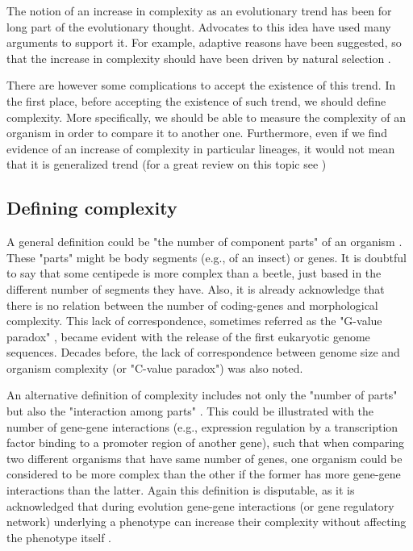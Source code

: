 The notion of an increase in complexity as an evolutionary trend has been for long part of the evolutionary thought. Advocates to this idea have used many arguments to support it. For example, adaptive reasons have been suggested, so that the increase in complexity should have been driven by natural selection \citep{bonner1988evolution,Carroll2001}.

There are however some complications to accept the existence of this trend. In the first place, before accepting the existence of such trend, we should define complexity.
More specifically, we should be able to measure the complexity of an organism in order to compare it to another one.
Furthermore, even if we find evidence of an increase of complexity in particular lineages, it would not mean that it is generalized trend (for a great review on this topic see \citep{McShea1996})


\subsection{Defining complexity}
A general definition could be "the number of component parts" of an organism \citep{McShea1996,Arthur2010}.
These "parts" might be body segments (e.g., of an insect) or genes.
It is doubtful to say that some centipede is more complex than a beetle, just based in the different number of segments they have.
Also, it is already acknowledge that there is no relation between the number of coding-genes and morphological complexity.
This lack of correspondence, sometimes referred as the "G-value paradox"
	\citep{Hahn2002},
became evident with the release of the first eukaryotic genome sequences.
Decades before, the lack of correspondence between genome size and organism complexity (or "C-value paradox") was also noted.

An alternative definition of complexity includes not only the "number of parts" but also the "interaction among parts" 
	\citep{McShea1996,Arthur2010}.
This could be illustrated with the number of gene-gene interactions (e.g., expression regulation by a transcription factor binding to a promoter region of another gene),
such that when comparing two different organisms that have same number of genes, 
one organism could be considered to be more complex than the other if the former has more gene-gene interactions than the latter.
Again this definition is disputable, as it is acknowledged that during evolution gene-gene interactions (or gene regulatory network) underlying a phenotype
can increase their complexity without affecting the phenotype itself
	\citep{Muller1999,True2001,Salazar-Ciudad2009}.

